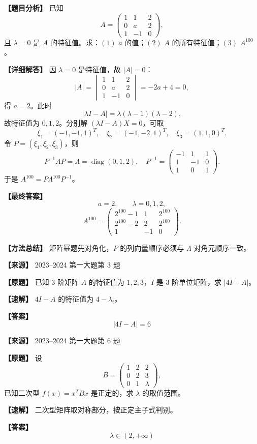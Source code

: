 \documentclass[11pt,a4paper,UTF8]{ctexart}
\newcommand{\diag}{\operatorname{diag}}
\begin{document}
\begin{answerbox}
\textbf{【题目分析】} 已知
\[
A=\begin{pmatrix}1&1&2\\0&a&2\\1&-1&0\end{pmatrix},
\]
且 $\lambda=0$ 是 $A$ 的特征值。求：$(1)$ $a$ 的值；$(2)$ $A$ 的所有特征值；$(3)$ $A^{100}$。

\textbf{【详细解答】} 因 $\lambda=0$ 是特征值，故 $|A|=0$：
\[
|A|=\begin{vmatrix}1&1&2\\0&a&2\\1&-1&0\end{vmatrix}=-2a+4=0,
\]
得 $a=2$。此时
\[
|\lambda I-A|=\lambda(\lambda-1)(\lambda-2),
\]
故特征值为 $0,1,2$。分别解 $(\lambda I-A)X=0$，可取
\[
\xi_1=(-1,-1,1)^T,\quad
\xi_2=(-1,-2,1)^T,\quad
\xi_3=(1,1,0)^T.
\]
令 $P=(\xi_1,\xi_2,\xi_3)$，则
\[
P^{-1}AP=\Lambda=\diag(0,1,2),
\quad
P^{-1}=\begin{pmatrix}-1&1&1\\1&-1&0\\1&0&1\end{pmatrix}.
\]
于是 $A^{100}=P\Lambda^{100}P^{-1}$。

\textbf{【最终答案】}
\[
a=2,\qquad \lambda=0,1,2,
\]
\[
A^{100}=
\begin{pmatrix}
2^{100}-1&1&2^{100}\\
2^{100}-2&2&2^{100}\\
1&-1&0
\end{pmatrix}.
\]

\textbf{【方法总结】} 矩阵幂题先对角化，$P$ 的列向量顺序必须与 $\Lambda$ 对角元顺序一致。
\end{answerbox}

\begin{answerbox}
\textbf{【来源】} 2023--2024 第一大题第 3 题

\textbf{【原题】}
已知 $3$ 阶矩阵 $A$ 的特征值为 $1,2,3$，$I$ 是 $3$ 阶单位矩阵，求 $|4I-A|$。

\textbf{【速解】}
$4I-A$ 的特征值为 $4-\lambda_i$。

\textbf{【答案】}
\[|4I-A|=6\]
\end{answerbox}

\begin{answerbox}
\textbf{【来源】} 2023--2024 第一大题第 6 题

\textbf{【原题】}
设
\[
B=\begin{pmatrix}1&2&2\\0&2&3\\0&1&\lambda\end{pmatrix},
\]
已知二次型 $f(x)=x^TBx$ 是正定的，求 $\lambda$ 的取值范围。

\textbf{【速解】}
二次型矩阵取对称部分，按正定主子式判别。

\textbf{【答案】}
\[\lambda\in(2,+\infty)\]
\end{answerbox}
\end{document}

